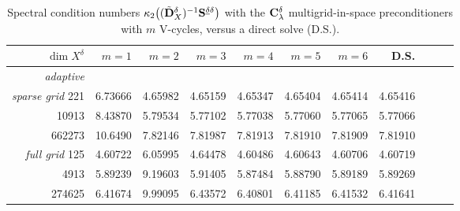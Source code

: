 \documentclass[11pt,a4paper,oneside,english]{amsart}
\numberwithin{equation}{section}
\numberwithin{theorem}{section}
\theoremstyle{definition}
\newcommand{\udelta}{{\underline{\delta}}}
\newcommand{\jw}[1]{{\color{red}{JW: #1}}}
\begin{document}
\begin{table}
  \begin{tabular}{rrrrrrrrrrr}\toprule
    $\dim X^\delta$ & $m=1$ & $m=2$ & $m=3$ & $m=4$ & $m=5$ & $m=6$ & D.S.\\\midrule
    \emph{adaptive} \quad
    \\\midrule
    \emph{sparse grid} \quad
    221      & 6.73666  & 4.65982& 4.65159& 4.65347& 4.65404&4.65414 & 4.65416\\
    10913    & 8.43870  & 5.79534& 5.77102& 5.77038& 5.77060&5.77065 & 5.77066\\
    662273   & 10.6490  & 7.82146& 7.81987& 7.81913& 7.81910&7.81909 & 7.81910\\
    \midrule
    \emph{full grid} \quad
    125     & 4.60722  & 6.05995  & 4.64478  & 4.60486  & 4.60643  & 4.60706  & 4.60719 \\
    4913    & 5.89239  & 9.19603  & 5.91405  & 5.87484  & 5.88790   & 5.89189  & 5.89269 \\
    274625  & 6.41674  & 9.99095  & 6.43572  & 6.40801  & 6.41185  & 6.41532  & 6.41641
    \\\bottomrule
  \end{tabular}
  \caption{Spectral condition numbers $\kappa_2\big((\tilde {\bf D}_X^\delta)^{-1} {\bf S}^{\udelta \delta}\big)$ with the ${\bf C}_\lambda^\delta$ multigrid-in-space preconditioners with $m$ V-cycles, versus a direct solve (D.S.).\jw{wording; ik wacht nog op numres}}
  \label{table:DX-precond}
\end{table}
\end{document}
